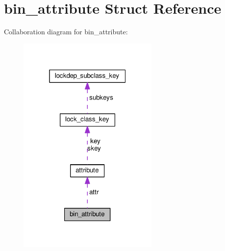 \hypertarget{structbin__attribute}{}\section{bin\+\_\+attribute Struct Reference}
\label{structbin__attribute}


Collaboration diagram for bin\+\_\+attribute\+:
\nopagebreak
\begin{figure}[H]
\begin{center}
\leavevmode
\includegraphics[width=196pt]{structbin__attribute__coll__graph}
\end{center}
\end{figure}

